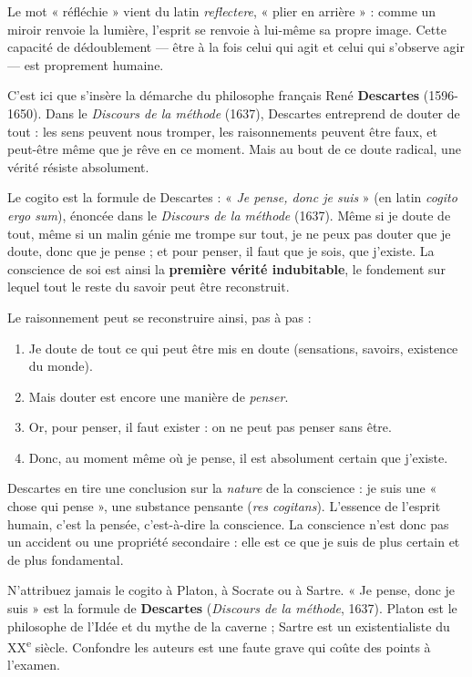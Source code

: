 \documentclass[11pt]{article}
\newcommand{\cle}[1]{{\popxbold\color{popdark}#1}}
\begin{document}
Le mot « réfléchie » vient du latin \emph{reflectere}, « plier en arrière » : comme un miroir renvoie la lumière, l'esprit se renvoie à lui-même sa propre image. Cette capacité de dédoublement — être à la fois celui qui agit et celui qui s'observe agir — est proprement humaine.

C'est ici que s'insère la démarche du philosophe français René \textbf{Descartes} (1596-1650). Dans le \emph{Discours de la méthode} (1637), Descartes entreprend de douter de tout : les sens peuvent nous tromper, les raisonnements peuvent être faux, et peut-être même que je rêve en ce moment. Mais au bout de ce doute radical, une vérité résiste absolument.

\begin{definition}
Le \cle{cogito} est la formule de Descartes : « \emph{Je pense, donc je suis} » (en latin \emph{cogito ergo sum}), énoncée dans le \emph{Discours de la méthode} (1637). Même si je doute de tout, même si un malin génie me trompe sur tout, je ne peux pas douter que je doute, donc que je pense ; et pour penser, il faut que je sois, que j'existe. La conscience de soi est ainsi la \textbf{première vérité indubitable}, le fondement sur lequel tout le reste du savoir peut être reconstruit.
\end{definition}

Le raisonnement peut se reconstruire ainsi, pas à pas :
\begin{enumerate}
\item Je doute de tout ce qui peut être mis en doute (sensations, savoirs, existence du monde).
\item Mais douter est encore une manière de \emph{penser}.
\item Or, pour penser, il faut exister : on ne peut pas penser sans être.
\item Donc, au moment même où je pense, il est absolument certain que j'existe.
\end{enumerate}

Descartes en tire une conclusion sur la \emph{nature} de la conscience : je suis une « chose qui pense », une \cle{substance pensante} (\emph{res cogitans}). L'essence de l'esprit humain, c'est la pensée, c'est-à-dire la conscience. La conscience n'est donc pas un accident ou une propriété secondaire : elle est ce que je suis de plus certain et de plus fondamental.

\begin{attention}
N'attribuez jamais le cogito à Platon, à Socrate ou à Sartre. « Je pense, donc je suis » est la formule de \textbf{Descartes} (\emph{Discours de la méthode}, 1637). Platon est le philosophe de l'Idée et du mythe de la caverne ; Sartre est un existentialiste du XX\textsuperscript{e} siècle. Confondre les auteurs est une faute grave qui coûte des points à l'examen.
\end{attention}
\end{document}
